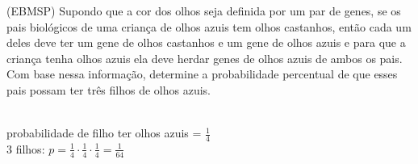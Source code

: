 \begin{ex}
  (EBMSP) Supondo que a cor dos olhos seja definida por um par de genes, se os pais biológicos de uma criança de olhos azuis tem olhos castanhos, então cada um deles deve ter um gene de olhos castanhos e um gene de olhos azuis e para que a criança tenha olhos azuis ela deve herdar genes de olhos azuis de ambos os pais.\\
  Com base nessa informação, determine a probabilidade percentual de que esses pais possam ter três filhos de olhos azuis.
    \begin{sol}
     \phantom{A} \\
     probabilidade de filho ter olhos azuis = $\frac{1}{4}$ \\
     3 filhos: \hspace{0,5cm} $p=\frac{1}{4}\cdot\frac{1}{4}\cdot\frac{1}{4}=\frac{1}{64}$
    \end{sol}
 \end{ex}